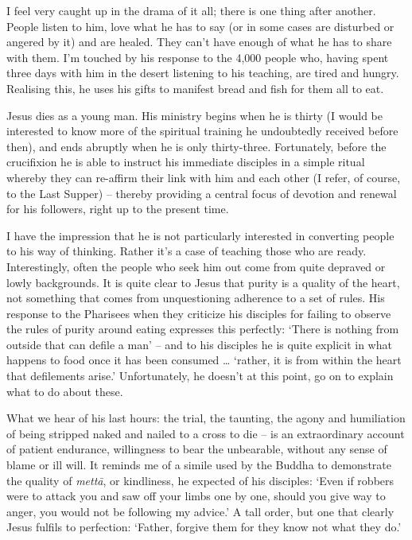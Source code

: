 I feel very caught up in the drama of it all; there is one thing after another. People listen to him, love what he has to say (or in some cases are disturbed or angered by it) and are healed. They can't have enough of what he has to share with them. I'm touched by his response to the 4,000 people who, having spent three days with him in the desert listening to his teaching, are tired and hungry. Realising this, he uses his gifts to manifest bread and fish for them all to eat.

Jesus dies as a young man. His ministry begins when he is thirty (I would be interested to know more of the spiritual training he undoubtedly received before then), and ends abruptly when he is only thirty-three. Fortunately, before the crucifixion he is able to instruct his immediate disciples in a simple ritual whereby they can re-affirm their link with him and each other (I refer, of course, to the Last Supper) -- thereby providing a central focus of devotion and renewal for his followers, right up to the present time.

I have the impression that he is not particularly interested in converting people to his way of thinking. Rather it's a case of teaching those who are ready. Interestingly, often the people who seek him out come from quite depraved or lowly backgrounds.  It is quite clear to Jesus that purity is a quality of the heart, not something that comes from unquestioning adherence to a set of rules. His response to the Pharisees when they criticize his disciples for failing to observe the rules of purity around eating expresses this perfectly: `There is nothing from outside that can defile a man' -- and to his disciples he is quite explicit in what happens to food once it has been consumed \ldots{} `rather, it is from within the heart that defilements arise.' Unfortunately, he doesn't at this point, go on to explain what to do about these.

What we hear of his last hours: the trial, the taunting, the agony and humiliation of being stripped naked and nailed to a cross to die -- is an extraordinary account of patient endurance, willingness to bear the unbearable, without any sense of blame or ill will. It reminds me of a simile used by the Buddha to demonstrate the quality of \textit{mett\=a}, or kindliness, he expected of his disciples: `Even if robbers were to attack you and saw off your limbs one by one, should you give way to anger, you would not be following my advice.' A tall order, but one that clearly Jesus fulfils to perfection: `Father, forgive them for they know not what they do.'


